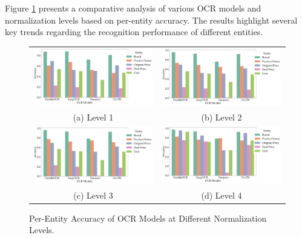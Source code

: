 \documentclass[11pt]{article}
\begin{document}
 Figure \ref{fig:eval_ocr_accuracies} presents a comparative analysis of various OCR models and normalization levels based on per-entity accuracy. The results highlight several key trends regarding the recognition performance of different entities.

\begin{figure}
    \begin{tabular}{cc}
      \includegraphics[width=0.5\linewidth]{figures/accuracy_level_1.png} &   \includegraphics[width=0.5\linewidth]{figures/accuracy_level_2.png} \\
    (a) Level 1 & (b) Level 2 \\[6pt]
     \includegraphics[width=0.5\linewidth]{figures/accuracy_level_3.png} &   \includegraphics[width=0.5\linewidth]{figures/accuracy_level_4.png} \\
    (c) Level 3 & (d) Level 4 \\[6pt]
    \end{tabular}
    \caption{Per-Entity Accuracy of OCR Models at Different Normalization Levels.}
    \label{fig:eval_ocr_accuracies}
    \end{figure}
\end{document}
